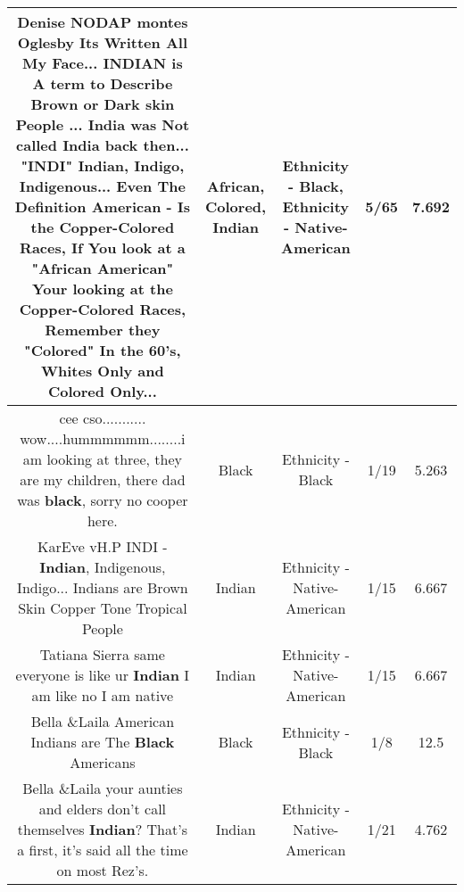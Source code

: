 \documentclass[11pt]{article}
\newlength\mylength
\begin{document}
\begin{center}
\begin{longtable}{|C{.65\mylength}|C{.30\mylength}|C{.12\mylength}|C{.12\mylength}|C{.12\mylength}|}
  \small Denise NODAP montes Oglesby Its Written All My Face... \textbf{INDIAN} is A term to Describe Brown or Dark skin People ... India was Not called India back then... "INDI" \textbf{Indian}, Indigo, Indigenous... Even The Definition American - Is the Copper-\textbf{Colored} Races, If You look at a "\textbf{African} American" Your looking at the Copper-\textbf{Colored} Races, Remember they "\textbf{Colored}" In the 60's, Whites Only and \textbf{Colored} Only...\normalsize   & African, Colored, Indian & Ethnicity - Black, Ethnicity - Native-American & 5/65 & 7.692 \\  \hline
  \small cee cso........... wow....hummmmmm........i am looking at three, they are my children, there dad was \textbf{black}, sorry no cooper here.\normalsize   & Black & Ethnicity - Black & 1/19 & 5.263 \\  \hline
  \small KarEve vH.P INDI - \textbf{Indian}, Indigenous, Indigo... Indians are Brown Skin Copper Tone Tropical People\normalsize   & Indian & Ethnicity - Native-American & 1/15 & 6.667 \\  \hline
  \small Tatiana Sierra  same everyone is like ur \textbf{Indian} I am like no I am native\normalsize   & Indian & Ethnicity - Native-American & 1/15 & 6.667 \\  \hline
  \small Bella \&Laila American Indians are The \textbf{Black} Americans\normalsize   & Black & Ethnicity - Black & 1/8 & 12.5 \\  \hline
  \small Bella \&Laila your aunties and elders don't call themselves \textbf{Indian}? That's a first, it's said all the time on most Rez's.\normalsize   & Indian & Ethnicity - Native-American & 1/21 & 4.762 \\  \hline

\end{longtable}
\end{center}
\end{document}
